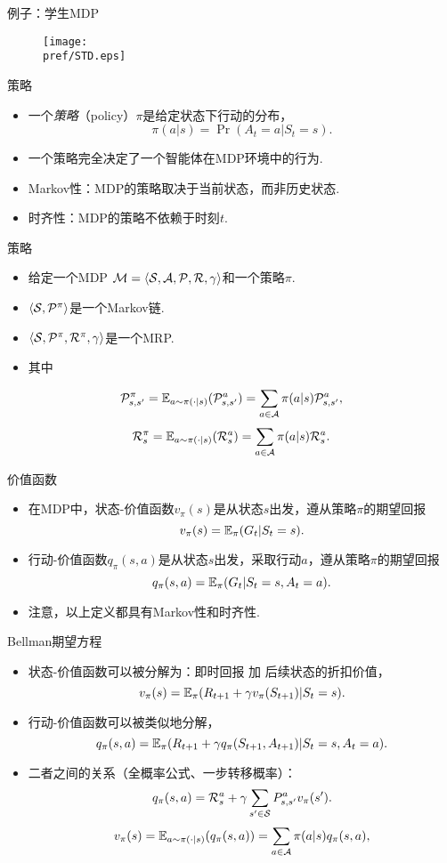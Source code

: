 {例子：学生MDP}
\begin{figure}
    \centering
    \texttt{[image: \\pref/STD.eps]}
\end{figure}


{策略}
\begin{itemize}
    \item     一个\emph{策略}（policy）$\pi$是给定状态下行动的分布，
    \[\pi(a|s) = \Pr(A_t=a | S_t = s).\]
    \item 一个策略完全决定了一个智能体在MDP环境中的行为.
    \item Markov性：MDP的策略取决于当前状态，而非历史状态.
    \item 时齐性：MDP的策略不依赖于时刻$t$.
\end{itemize}


{策略}
\begin{itemize}
    \item 给定一个MDP $\mathcal M=\langle\mathcal S,\mathcal A,\mathcal P,\mathcal R, \gamma\rangle$和一个策略$\pi$.
    \item $\langle \mathcal S, \mathcal P^{\pi}\rangle$是一个Markov链.
    \item $\langle\mathcal S,\mathcal P^{\pi}, \mathcal R^{\pi}, \gamma\rangle$是一个MRP.
    \item 其中
\end{itemize}
\[\mathcal P_{s,s'}^{\pi} = \mathbb{E}_{a\sim\pi(\cdot|s)}(\mathcal P^a_{s,s'})=\sum_{a\in \mathcal A}\pi(a|s)\mathcal P_{s,s'}^{a},\]
    \[\mathcal R_s^{\pi} =\mathbb{E}_{a\sim\pi(\cdot|s)}(\mathcal R^a_s)=\sum_{a\in\mathcal A}\pi(a|s)\mathcal R_s^a.\]


{价值函数}
\begin{itemize}
    \item 在MDP中，状态-价值函数$v_\pi(s)$是从状态$s$出发，遵从策略$\pi$的期望回报
    \[v_\pi(s) = \mathbb{E}_\pi(G_t|S_t=s).\]
    \item     行动-价值函数$q_\pi(s,a)$是从状态$s$出发，采取行动$a$，遵从策略$\pi$的期望回报
    \[q_\pi(s,a) = \mathbb{E}_\pi(G_t|S_t=s,A_t=a).\]
    \item 注意，以上定义都具有Markov性和时齐性.
\end{itemize}


{Bellman期望方程}
\begin{itemize}
    \item 状态-价值函数可以被分解为：即时回报 加 后续状态的折扣价值，
\[v_\pi(s) = \mathbb{E}_\pi(R_{t+1} + \gamma v_\pi(S_{t+1})|S_t=s).\]
\item 行动-价值函数可以被类似地分解，
\[q_\pi(s,a) = \mathbb{E}_\pi(R_{t+1} + \gamma q_\pi(S_{t+1},A_{t+1})|S_t=s,A_t=a).\]
\item 二者之间的关系（全概率公式、一步转移概率）：
\[q_\pi(s,a) =\mathcal R_s^a + \gamma \sum_{s'\in \mathcal S}P_{s,s'}^a v_\pi(s').\]
\[v_\pi(s) = \mathbb{E}_{a\sim\pi(\cdot|s)}(q_\pi(s,a))=\sum_{a\in\mathcal A}\pi(a|s)q_\pi(s,a),\]
\end{itemize}


